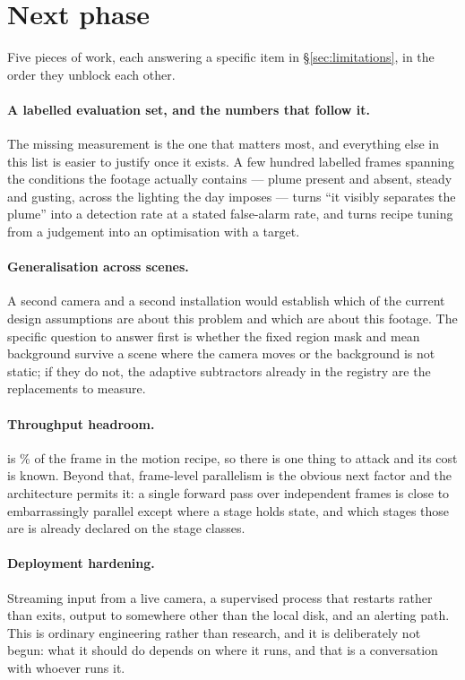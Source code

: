 \section{Next phase}
\label{sec:next}

Five pieces of work, each answering a specific item in §\ref{sec:limitations},
in the order they unblock each other.

\paragraph{A labelled evaluation set, and the numbers that follow it.} The
missing measurement is the one that matters most, and everything else in this
list is easier to justify once it exists. A few hundred labelled frames spanning
the conditions the footage actually contains --- plume present and absent, steady
and gusting, across the lighting the day imposes --- turns ``it visibly separates
the plume'' into a detection rate at a stated false-alarm rate, and turns recipe
tuning from a judgement into an optimisation with a target.

\paragraph{Generalisation across scenes.} A second camera and a second
installation would establish which of the current design assumptions are about
this problem and which are about this footage. The specific question to answer
first is whether the fixed region mask and mean background survive a scene where
the camera moves or the background is not static; if they do not, the adaptive
subtractors already in the registry are the replacements to measure.

\paragraph{Throughput headroom.} \texttt{\BenchDearestStage} is
\BenchDearestShare\% of the frame in the motion recipe, so there is one thing to
attack and its cost is known. Beyond that, frame-level parallelism is the obvious
next factor and the architecture permits it: a single forward pass over
independent frames is close to embarrassingly parallel except where a stage holds
state, and which stages those are is already declared on the stage classes.

\paragraph{Deployment hardening.} Streaming input from a live camera, a
supervised process that restarts rather than exits, output to somewhere other
than the local disk, and an alerting path. This is ordinary engineering rather
than research, and it is deliberately not begun: what it should do depends on
where it runs, and that is a conversation with whoever runs it.

